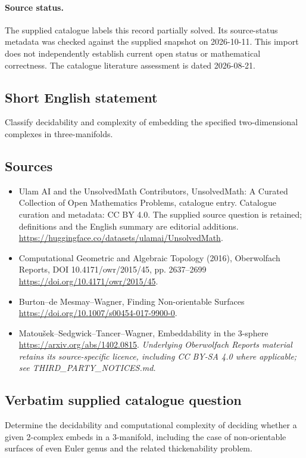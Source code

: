 \documentclass[11pt]{article}
\begin{document}
\paragraph{Source status.}
The supplied catalogue labels this record partially solved. Its source-status metadata was checked against the supplied snapshot on 2026-10-11. This import does not independently establish current open status or mathematical correctness. The catalogue literature assessment is dated 2026-08-21.
\subsection{Short English statement}
Classify decidability and complexity of embedding the specified two-dimensional complexes in three-manifolds.
\subsection{Sources}
\begin{itemize}
\item[S1] Ulam AI and the UnsolvedMath Contributors, UnsolvedMath: A Curated Collection of Open Mathematics Problems, catalogue entry. Catalogue curation and metadata: CC BY 4.0. The supplied source question is retained; definitions and the English summary are editorial additions.
\url{https://huggingface.co/datasets/ulamai/UnsolvedMath}.
\item[S2] Computational Geometric and Algebraic Topology (2016), Oberwolfach Reports, DOI 10.4171/owr/2015/45, pp. 2637--2699
\url{https://doi.org/10.4171/owr/2015/45}.
\item[S3] Burton--de Mesmay--Wagner, Finding Non-orientable Surfaces
\url{https://doi.org/10.1007/s00454-017-9900-0}.
\item[S4] Matoušek--Sedgwick--Tancer--Wagner, Embeddability in the 3-sphere
\url{https://arxiv.org/abs/1402.0815}.
\textit{Underlying Oberwolfach Reports material retains its source-specific licence, including CC BY-SA 4.0 where applicable; see THIRD\_PARTY\_NOTICES.md.}
\end{itemize}
\subsection{Verbatim supplied catalogue question}
Determine the decidability and computational complexity of deciding whether a given 2-complex embeds in a 3-manifold, including the case of non-orientable surfaces of even Euler genus and the related thickenability problem.
\end{document}
